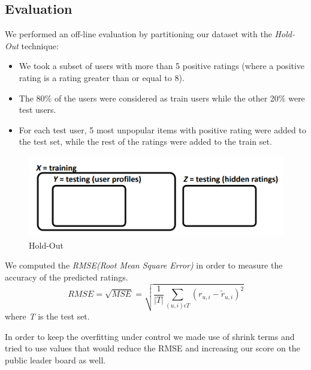 \documentclass{acm_proc_article-sp}
\begin{document}
\subsection{Evaluation}
We performed an off-line evaluation by partitioning our dataset with the \textit{Hold-Out} technique:

\begin{itemize}
  \item We took a subset of users with more than 5 positive ratings (where a positive rating is a rating greater than or equal to 8).
  \item The 80\% of the users were considered as train users while the other 20\% were test users.
  \item For each test user, 5 most unpopular items with positive rating were added to the test set, while the rest of the ratings were added to the train set.
\end{itemize}

\begin{figure}[h]
\centering
\includegraphics[width=\linewidth]{hold-out.png}
\caption{Hold-Out}
\end{figure}

We computed the \textit{RMSE(Root Mean Square Error)} in order to measure the accuracy of the predicted ratings.
\begin{equation}RMSE = \sqrt{MSE} = \sqrt{\frac{1}{\lvert T \rvert}\sum_{(u,i) \epsilon T}(r_{u,i} - \widetilde{r}_{u,i})^2}\end{equation}
where \textit{T} is the test set.

In order to keep the overfitting under control we made use of shrink terms and tried to use values that would reduce the RMSE and increasing our score on the public leader board as well.
\end{document}
